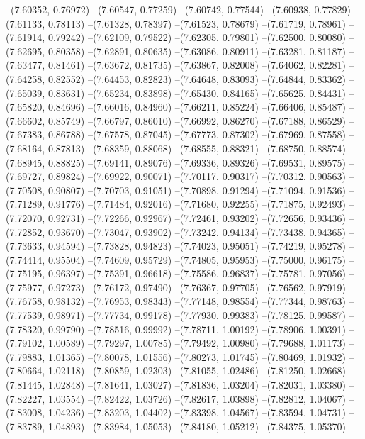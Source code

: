 --(7.60352, 0.76972)
--(7.60547, 0.77259)
--(7.60742, 0.77544)
--(7.60938, 0.77829)
--(7.61133, 0.78113)
--(7.61328, 0.78397)
--(7.61523, 0.78679)
--(7.61719, 0.78961)
--(7.61914, 0.79242)
--(7.62109, 0.79522)
--(7.62305, 0.79801)
--(7.62500, 0.80080)
--(7.62695, 0.80358)
--(7.62891, 0.80635)
--(7.63086, 0.80911)
--(7.63281, 0.81187)
--(7.63477, 0.81461)
--(7.63672, 0.81735)
--(7.63867, 0.82008)
--(7.64062, 0.82281)
--(7.64258, 0.82552)
--(7.64453, 0.82823)
--(7.64648, 0.83093)
--(7.64844, 0.83362)
--(7.65039, 0.83631)
--(7.65234, 0.83898)
--(7.65430, 0.84165)
--(7.65625, 0.84431)
--(7.65820, 0.84696)
--(7.66016, 0.84960)
--(7.66211, 0.85224)
--(7.66406, 0.85487)
--(7.66602, 0.85749)
--(7.66797, 0.86010)
--(7.66992, 0.86270)
--(7.67188, 0.86529)
--(7.67383, 0.86788)
--(7.67578, 0.87045)
--(7.67773, 0.87302)
--(7.67969, 0.87558)
--(7.68164, 0.87813)
--(7.68359, 0.88068)
--(7.68555, 0.88321)
--(7.68750, 0.88574)
--(7.68945, 0.88825)
--(7.69141, 0.89076)
--(7.69336, 0.89326)
--(7.69531, 0.89575)
--(7.69727, 0.89824)
--(7.69922, 0.90071)
--(7.70117, 0.90317)
--(7.70312, 0.90563)
--(7.70508, 0.90807)
--(7.70703, 0.91051)
--(7.70898, 0.91294)
--(7.71094, 0.91536)
--(7.71289, 0.91776)
--(7.71484, 0.92016)
--(7.71680, 0.92255)
--(7.71875, 0.92493)
--(7.72070, 0.92731)
--(7.72266, 0.92967)
--(7.72461, 0.93202)
--(7.72656, 0.93436)
--(7.72852, 0.93670)
--(7.73047, 0.93902)
--(7.73242, 0.94134)
--(7.73438, 0.94365)
--(7.73633, 0.94594)
--(7.73828, 0.94823)
--(7.74023, 0.95051)
--(7.74219, 0.95278)
--(7.74414, 0.95504)
--(7.74609, 0.95729)
--(7.74805, 0.95953)
--(7.75000, 0.96175)
--(7.75195, 0.96397)
--(7.75391, 0.96618)
--(7.75586, 0.96837)
--(7.75781, 0.97056)
--(7.75977, 0.97273)
--(7.76172, 0.97490)
--(7.76367, 0.97705)
--(7.76562, 0.97919)
--(7.76758, 0.98132)
--(7.76953, 0.98343)
--(7.77148, 0.98554)
--(7.77344, 0.98763)
--(7.77539, 0.98971)
--(7.77734, 0.99178)
--(7.77930, 0.99383)
--(7.78125, 0.99587)
--(7.78320, 0.99790)
--(7.78516, 0.99992)
--(7.78711, 1.00192)
--(7.78906, 1.00391)
--(7.79102, 1.00589)
--(7.79297, 1.00785)
--(7.79492, 1.00980)
--(7.79688, 1.01173)
--(7.79883, 1.01365)
--(7.80078, 1.01556)
--(7.80273, 1.01745)
--(7.80469, 1.01932)
--(7.80664, 1.02118)
--(7.80859, 1.02303)
--(7.81055, 1.02486)
--(7.81250, 1.02668)
--(7.81445, 1.02848)
--(7.81641, 1.03027)
--(7.81836, 1.03204)
--(7.82031, 1.03380)
--(7.82227, 1.03554)
--(7.82422, 1.03726)
--(7.82617, 1.03898)
--(7.82812, 1.04067)
--(7.83008, 1.04236)
--(7.83203, 1.04402)
--(7.83398, 1.04567)
--(7.83594, 1.04731)
--(7.83789, 1.04893)
--(7.83984, 1.05053)
--(7.84180, 1.05212)
--(7.84375, 1.05370)
